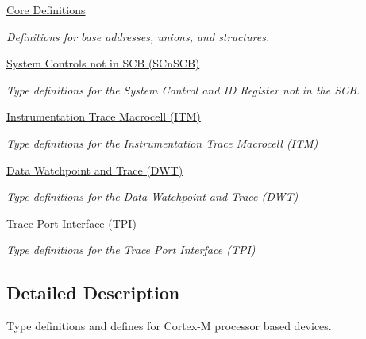 \begin{DoxyCompactItemize}
\hyperlink{group___c_m_s_i_s__core__base}{Core Definitions}
\begin{DoxyCompactList}\small\item\em Definitions for base addresses, unions, and structures. \end{DoxyCompactList}\item 
\hyperlink{group___c_m_s_i_s___s_cn_s_c_b}{System Controls not in S\+C\+B (\+S\+Cn\+S\+C\+B)}
\begin{DoxyCompactList}\small\item\em Type definitions for the System Control and ID Register not in the S\+CB. \end{DoxyCompactList}\item 
\hyperlink{group___c_m_s_i_s___i_t_m}{Instrumentation Trace Macrocell (\+I\+T\+M)}
\begin{DoxyCompactList}\small\item\em Type definitions for the Instrumentation Trace Macrocell (I\+TM) \end{DoxyCompactList}\item 
\hyperlink{group___c_m_s_i_s___d_w_t}{Data Watchpoint and Trace (\+D\+W\+T)}
\begin{DoxyCompactList}\small\item\em Type definitions for the Data Watchpoint and Trace (D\+WT) \end{DoxyCompactList}\item 
\hyperlink{group___c_m_s_i_s___t_p_i}{Trace Port Interface (\+T\+P\+I)}
\begin{DoxyCompactList}\small\item\em Type definitions for the Trace Port Interface (T\+PI) \end{DoxyCompactList}\end{DoxyCompactItemize}


\subsection{Detailed Description}
Type definitions and defines for Cortex-\/M processor based devices. 

